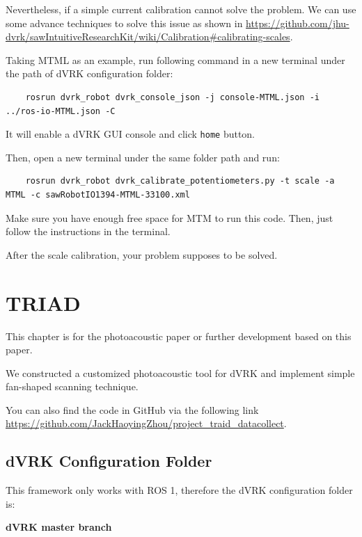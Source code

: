 Nevertheless, if a simple current calibration cannot solve the problem. We can use some advance techniques to solve this issue as shown in \url{https://github.com/jhu-dvrk/sawIntuitiveResearchKit/wiki/Calibration#calibrating-scales}. 

Taking MTML as an example, run following command in a new terminal under the path of dVRK configuration folder:

\begin{verbatim}
    rosrun dvrk_robot dvrk_console_json -j console-MTML.json -i ../ros-io-MTML.json -C
\end{verbatim}

It will enable a dVRK GUI console and click \texttt{home} button.

Then, open a new terminal under the same folder path and run:

\begin{verbatim}
    rosrun dvrk_robot dvrk_calibrate_potentiometers.py -t scale -a MTML -c sawRobotIO1394-MTML-33100.xml
\end{verbatim}

Make sure you have enough free space for MTM to run this code. Then, just follow the instructions in the terminal.

After the scale calibration, your problem supposes to be solved.







\chapter{TRIAD}
\label{ch: triad}

This chapter is for the photoacoustic paper \cite{gao2023laparoscopic} or further development based on this paper.

We constructed a customized photoacoustic tool for dVRK and implement simple fan-shaped scanning technique.

You can also find the code in GitHub via the following link \url{https://github.com/JackHaoyingZhou/project_traid_datacollect}.

\section{dVRK Configuration Folder}

This framework only works with ROS 1, therefore the dVRK configuration folder is:

\textbf{dVRK master branch}


